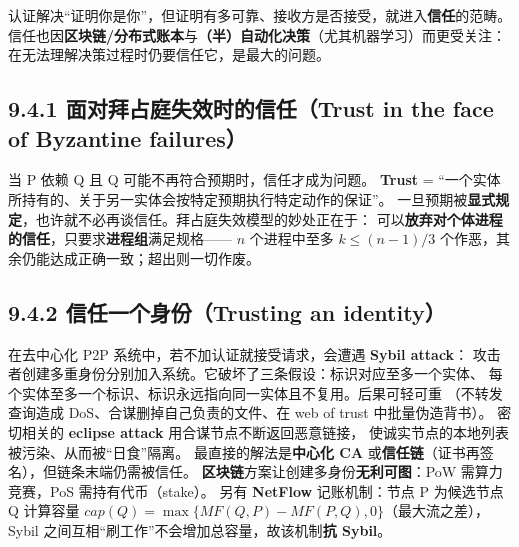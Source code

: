 
认证解决“证明你是你”，但证明有多可靠、接收方是否接受，就进入\textbf{信任}的范畴。
信任也因\textbf{区块链/分布式账本}与\textbf{（半）自动化决策}（尤其机器学习）而更受关注：
在无法理解决策过程时仍要信任它，是最大的问题。

\subsection*{9.4.1 面对拜占庭失效时的信任（Trust in the face of Byzantine failures）}
当 P 依赖 Q 且 Q 可能不再符合预期时，信任才成为问题。
\textbf{Trust} = “一个实体所持有的、关于另一实体会按特定预期执行特定动作的保证”。
一旦预期被\textbf{显式规定}，也许就不必再谈信任。拜占庭失效模型的妙处正在于：
可以\textbf{放弃对个体进程的信任}，只要求\textbf{进程组}满足规格——
$n$ 个进程中至多 $k \le (n-1)/3$ 个作恶，其余仍能达成正确一致；超出则一切作废。

\begin{closeread}
\end{closeread}


\subsection*{9.4.2 信任一个身份（Trusting an identity）}
在去中心化 P2P 系统中，若不加认证就接受请求，会遭遇 \textbf{Sybil attack}：
攻击者创建多重身份分别加入系统。它破坏了三条假设：标识对应至多一个实体、
每个实体至多一个标识、标识永远指向同一实体且不复用。后果可轻可重
（不转发查询造成 DoS、合谋删掉自己负责的文件、在 web of trust 中批量伪造背书）。
密切相关的 \textbf{eclipse attack} 用合谋节点不断返回恶意链接，
使诚实节点的本地列表被污染、从而被“日食”隔离。
最直接的解法是\textbf{中心化 CA} 或\textbf{信任链}（证书再签名），但链条末端仍需被信任。
\textbf{区块链}方案让创建多身份\textbf{无利可图}：PoW 需算力竞赛，PoS 需持有代币（stake）。
另有 \textbf{NetFlow} 记账机制：节点 P 为候选节点 Q 计算容量
$cap(Q) = \max\{MF(Q,P) - MF(P,Q), 0\}$（最大流之差），
Sybil 之间互相“刷工作”不会增加总容量，故该机制\textbf{抗 Sybil}。

\begin{closeread}
\end{closeread}


